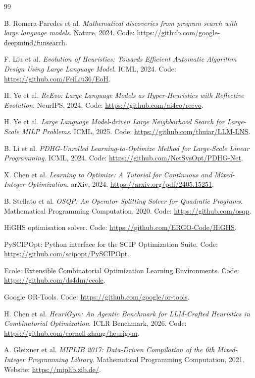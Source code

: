 \documentclass[12pt,a4paper]{ctexart}
\begin{document}
\begin{thebibliography}{99}

B. Romera-Paredes et al. \emph{Mathematical discoveries from program search with large language models}. Nature, 2024. Code: \url{https://github.com/google-deepmind/funsearch}.

F. Liu et al. \emph{Evolution of Heuristics: Towards Efficient Automatic Algorithm Design Using Large Language Model}. ICML, 2024. Code: \url{https://github.com/FeiLiu36/EoH}.

H. Ye et al. \emph{ReEvo: Large Language Models as Hyper-Heuristics with Reflective Evolution}. NeurIPS, 2024. Code: \url{https://github.com/ai4co/reevo}.

H. Ye et al. \emph{Large Language Model-driven Large Neighborhood Search for Large-Scale MILP Problems}. ICML, 2025. Code: \url{https://github.com/thuiar/LLM-LNS}.

B. Li et al. \emph{PDHG-Unrolled Learning-to-Optimize Method for Large-Scale Linear Programming}. ICML, 2024. Code: \url{https://github.com/NetSysOpt/PDHG-Net}.

X. Chen et al. \emph{Learning to Optimize: A Tutorial for Continuous and Mixed-Integer Optimization}. arXiv, 2024. \url{https://arxiv.org/pdf/2405.15251}.

B. Stellato et al. \emph{OSQP: An Operator Splitting Solver for Quadratic Programs}. Mathematical Programming Computation, 2020. Code: \url{https://github.com/osqp}.

HiGHS optimisation solver. Code: \url{https://github.com/ERGO-Code/HiGHS}.

PySCIPOpt: Python interface for the SCIP Optimization Suite. Code: \url{https://github.com/scipopt/PySCIPOpt}.

Ecole: Extensible Combinatorial Optimization Learning Environments. Code: \url{https://github.com/ds4dm/ecole}.

Google OR-Tools. Code: \url{https://github.com/google/or-tools}.

H. Chen et al. \emph{HeuriGym: An Agentic Benchmark for LLM-Crafted Heuristics in Combinatorial Optimization}. ICLR Benchmark, 2026. Code: \url{https://github.com/cornell-zhang/heurigym}.

A. Gleixner et al. \emph{MIPLIB 2017: Data-Driven Compilation of the 6th Mixed-Integer Programming Library}. Mathematical Programming Computation, 2021. Website: \url{https://miplib.zib.de/}.

\end{thebibliography}
\end{document}
